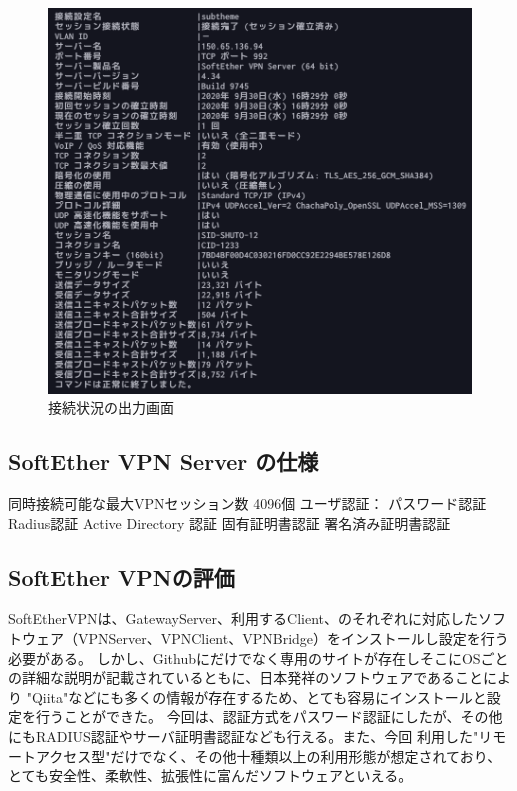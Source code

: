 \documentclass[11pt,a4j,titlepage]{jreport}
\begin{document}
\begin{figure}[H]
    \centering
    \includegraphics*[width=1.0\textwidth,page=1]{graphs/accountstatusget.png}
    \caption{接続状況の出力画面}
    \label{accountstatusget}
\end{figure}


\subsection*{SoftEther VPN Server の仕様}
同時接続可能な最大VPNセッション数
4096個
ユーザ認証：
パスワード認証
Radius認証
Active Directory 認証
固有証明書認証
署名済み証明書認証
\fi





\subsection*{SoftEther VPNの評価}
SoftEtherVPNは、GatewayServer、利用するClient、のそれぞれに対応したソフトウェア（VPNServer、VPNClient、VPNBridge）をインストールし設定を行う必要がある。
しかし、Githubにだけでなく専用のサイトが存在しそこにOSごとの詳細な説明が記載されているともに、日本発祥のソフトウェアであることにより
"Qiita"などにも多くの情報が存在するため、とても容易にインストールと設定を行うことができた。
今回は、認証方式をパスワード認証にしたが、その他にもRADIUS認証やサーバ証明書認証なども行える。また、今回
利用した"リモートアクセス型"だけでなく、その他十種類以上の利用形態が想定されており、
とても安全性、柔軟性、拡張性に富んだソフトウェアといえる。
\end{document}

